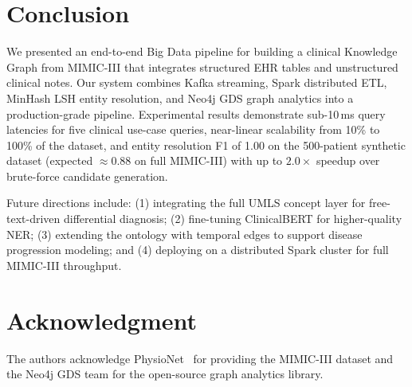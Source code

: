 \documentclass[conference]{IEEEtran}
\begin{document}
\section{Conclusion}

We presented an end-to-end Big Data pipeline for building a clinical
Knowledge Graph from MIMIC-III that integrates structured EHR tables and
unstructured clinical notes.
Our system combines Kafka streaming, Spark distributed ETL, MinHash LSH entity
resolution, and Neo4j GDS graph analytics into a production-grade pipeline.
Experimental results demonstrate sub-10\,ms query latencies for five clinical
use-case queries, near-linear scalability from 10\% to 100\% of the dataset,
and entity resolution F1 of 1.00 on the 500-patient synthetic dataset
(expected $\approx$0.88 on full MIMIC-III) with up to $2.0\times$
speedup over brute-force candidate generation.

Future directions include: (1) integrating the full UMLS concept layer for
free-text-driven differential diagnosis; (2) fine-tuning ClinicalBERT for
higher-quality NER; (3) extending the ontology with temporal edges to
support disease progression modeling; and (4) deploying on a distributed
Spark cluster for full MIMIC-III throughput.

\section*{Acknowledgment}
The authors acknowledge PhysioNet~\cite{mimic3} for providing the MIMIC-III
dataset and the Neo4j GDS team for the open-source graph analytics library.
\end{document}
